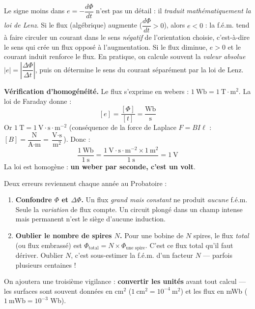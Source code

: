 \documentclass[11pt]{article}
\begin{document}
\begin{aretenir}
Le signe moins dans $e = -\dfrac{d\Phi}{dt}$ n'est pas un détail : il \emph{traduit mathématiquement la loi de Lenz}. Si le flux (algébrique) augmente ($\dfrac{d\Phi}{dt} > 0$), alors $e < 0$ : la f.é.m. tend à faire circuler un courant dans le sens \emph{négatif} de l'orientation choisie, c'est-à-dire le sens qui crée un flux opposé à l'augmentation. Si le flux diminue, $e > 0$ et le courant induit renforce le flux. En pratique, on calcule souvent la \emph{valeur absolue} $|e| = \left|\dfrac{\Delta \Phi}{\Delta t}\right|$, puis on détermine le sens du courant séparément par la loi de Lenz.
\end{aretenir}

\textbf{Vérification d'homogénéité.} Le flux s'exprime en webers : $1~\text{Wb} = 1~\text{T} \cdot \text{m}^2$. La loi de Faraday donne :
\[ [e] = \frac{[\Phi]}{[t]} = \frac{\text{Wb}}{\text{s}} \]
Or $1~\text{T} = 1~\text{V} \cdot \text{s} \cdot \text{m}^{-2}$ (conséquence de la force de Laplace $F = B I \ell$ : $[B] = \dfrac{\text{N}}{\text{A} \cdot \text{m}} = \dfrac{\text{V} \cdot \text{s}}{\text{m}^2}$). Donc :
\[ \frac{1~\text{Wb}}{1~\text{s}} = \frac{1~\text{V} \cdot \text{s} \cdot \text{m}^{-2} \times 1~\text{m}^2}{1~\text{s}} = 1~\text{V} \]
La loi est homogène : \textbf{un weber par seconde, c'est un volt}.

\begin{attention}
Deux erreurs reviennent chaque année au Probatoire :
\begin{enumerate}
\item \textbf{Confondre $\Phi$ et $\Delta \Phi$.} Un flux \emph{grand mais constant} ne produit \emph{aucune} f.é.m. Seule la \emph{variation} de flux compte. Un circuit plongé dans un champ intense mais permanent n'est le siège d'aucune induction.
\item \textbf{Oublier le nombre de spires $N$.} Pour une bobine de $N$ spires, le flux \emph{total} (ou flux embrassé) est $\Phi_{\text{total}} = N \times \Phi_{\text{une spire}}$. C'est ce flux total qu'il faut dériver. Oublier $N$, c'est sous-estimer la f.é.m. d'un facteur $N$ — parfois plusieurs centaines !
\end{enumerate}
On ajoutera une troisième vigilance : \textbf{convertir les unités} avant tout calcul — les surfaces sont souvent données en cm$^2$ ($1~\text{cm}^2 = 10^{-4}~\text{m}^2$) et les flux en mWb ($1~\text{mWb} = 10^{-3}$ Wb).
\end{attention}
\end{document}
